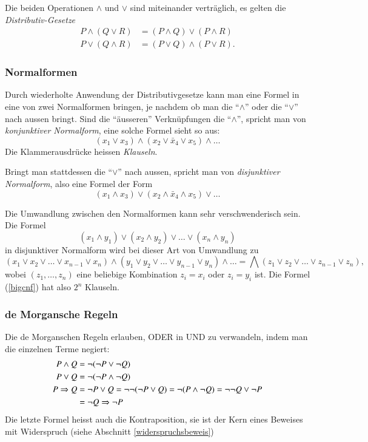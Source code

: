 Die beiden Operationen $\wedge$ und $\vee$ sind miteinander verträglich,
es gelten die {\em Distributiv-Gesetze}
\begin{align*}
P\wedge(Q\vee R)&=(P\wedge Q)\vee (P\wedge R)\\
P\vee(Q\wedge R)&=(P\vee Q)\wedge (P\vee R).
\end{align*}
%

\subsubsection{Normalformen}
%
%
Durch wiederholte Anwendung der Distributivgesetze kann man 
eine Formel in eine von zwei Normalformen bringen, je nachdem
ob man die ``$\wedge$'' oder die ``$\vee$'' nach aussen bringt.
Sind die ``äusseren'' Verknüpfungen die ``$\wedge$'', spricht
man von {\em konjunktiver Normalform}, eine solche Formel sieht so aus:
\[
(x_1\vee x_3)\wedge(x_2\vee \bar x_4\vee x_5)\wedge\dots
\]
Die Klammerausdrücke heissen {\em Klauseln}.
%

Bringt man stattdessen die ``$\vee$'' nach aussen, spricht man von
{\em disjunktiver Normalform}, also eine Formel der Form
%
\[
(x_1\wedge x_3)\vee(x_2\wedge \bar x_4\wedge x_5)\vee\dots
\]

Die Umwandlung zwischen den Normalformen kann sehr verschwenderisch sein.
Die Formel
\[
(x_1\wedge y_1)\vee(x_2\wedge y_2)\vee\dots\vee (x_n\wedge y_n)
\]
in disjunktiver Normalform wird bei dieser Art von Umwandlung zu
\begin{equation}
(x_1\vee x_2\vee\dots\vee x_{n-1}\vee x_n)
\wedge
(y_1\vee y_2\vee\dots\vee y_{n-1}\vee y_n)
\wedge
\dots 
=\bigwedge (z_1\vee z_2\vee\dots \vee z_{n-1}\vee z_n),
\label{bigcnf}
\end{equation}
wobei $(z_1,\dots,z_n)$ eine beliebige Kombination $z_i=x_i$ oder $z_i=y_i$
ist.
Die Formel (\ref{bigcnf}) hat also $2^n$ Klauseln.

\subsubsection{de Morgansche Regeln}
%
Die de Morganschen Regeln erlauben, ODER in UND zu verwandeln, indem
man die einzelnen Terme negiert:
\begin{align}
P\wedge Q&= \neg(\neg P\vee\neg Q)\notag\\
P\vee Q&= \neg(\neg P\wedge\neg Q)\notag\\
P\Rightarrow Q&=\neg P\vee Q=\neg\neg(\neg P\vee Q)=\neg(P\wedge\neg Q)=\neg\neg Q\vee \neg P\notag\\
&=\neg Q\Rightarrow \neg P\label{kontraposition}
\end{align}
%
Die letzte Formel heisst auch die Kontraposition, sie ist der Kern
eines Beweises mit Widerspruch (siehe Abschnitt \ref{widerspruchsbeweis})


